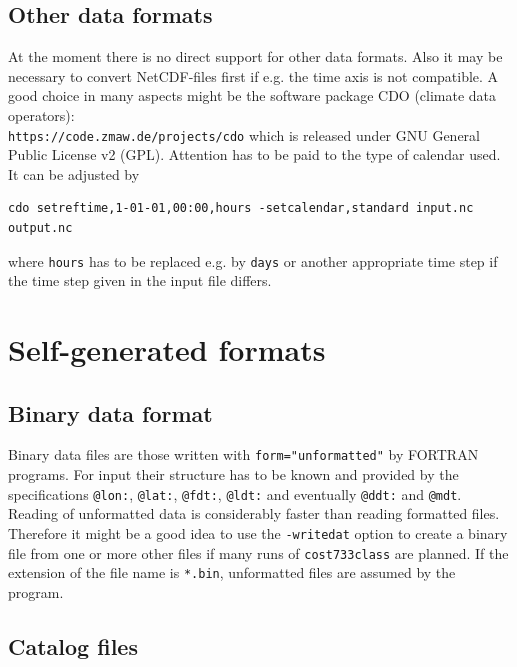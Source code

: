 \documentclass[12pt, oneside, a4paper, headsepline, plainheadsepline]{scrbook}
\begin{document}
\subsection{Other data formats}
At the moment there is no direct support for other data formats.
Also it may be necessary to convert NetCDF-files first if e.g. the time axis is not
compatible.
A good choice in many aspects might be the software package CDO (climate data operators): \\
\verb+https://code.zmaw.de/projects/cdo+ which is released under GNU General Public License v2 (GPL).
Attention has to be paid to the type of calendar used. It can be adjusted by
\begin{lstlisting}
cdo setreftime,1-01-01,00:00,hours -setcalendar,standard input.nc output.nc
\end{lstlisting}
where \verb+hours+ has to be replaced e.g. by \verb+days+ or another appropriate 
time step if the time step given in the input file differs.

\section{Self-generated formats}

\subsection{Binary data format}
Binary data files are those written with \verb+form="unformatted"+ by FORTRAN programs. For input their structure
has to be known and provided by the specifications \verb+@lon:+, \verb+@lat:+, \verb+@fdt:+, \verb+@ldt:+ and eventually
\verb+@ddt:+ and \verb+@mdt+. Reading of unformatted data is considerably faster than reading formatted files. Therefore 
it might be a good idea to use the \verb+-writedat+ option to create a binary file from one or more other files if many 
runs of \verb+cost733class+ are planned. If the extension of the file name is \verb+*.bin+, unformatted files are assumed
by the program.

\subsection{Catalog files}
\label{clainput}
\end{document}
